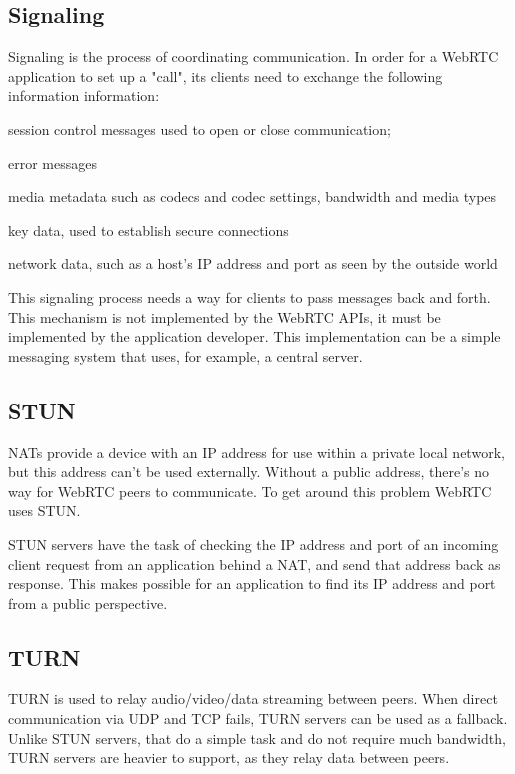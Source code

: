 \subsection{Signaling}
\label{sec:signaling}
Signaling\cite{site_webrtc_signaling} is the process of coordinating communication. In order for a WebRTC application to set up a "call", its clients need to exchange the following information information: \begin{enumerate*}[(i)]
\item session control messages used to open or close communication;
\item error messages
\item media metadata such as codecs and codec settings, bandwidth and media types
\item key data, used to establish secure connections
\item network data, such as a host's IP address and port as seen by the outside world
\end{enumerate*}\par
This signaling process needs a way for clients to pass messages back and forth. This mechanism is not implemented by the WebRTC APIs, it must be implemented by the application developer. This implementation can be a simple messaging system that uses, for example, a central server.

\subsection{STUN}
\label{sec:stun}
NATs provide a device with an IP address for use within a private local network, but this address can't be used externally. Without a public address, there's no way for WebRTC peers to communicate. To get around this problem WebRTC uses STUN.\par
	STUN servers have the task of checking the IP address and port of an incoming client request from an application behind a NAT, and send that address back as response. This makes possible for an application to find its IP address and port from a public perspective.
	
\subsection{TURN}
\label{sec:turn}
TURN is used to relay audio/video/data streaming between peers. When direct communication via UDP and TCP fails, TURN servers can be used as a fallback. Unlike STUN servers, that do a simple task and do not require much bandwidth, TURN servers are heavier to support, as they relay data between peers.

